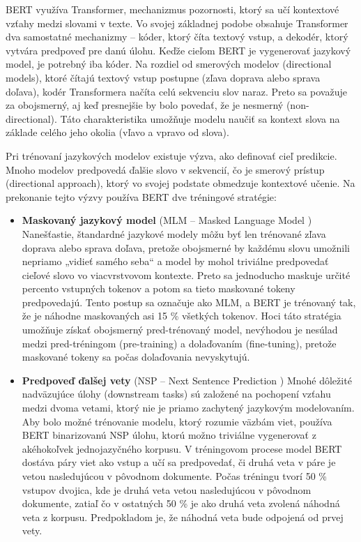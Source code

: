 BERT využíva Transformer, mechanizmus pozornosti, ktorý sa učí kontextové vzťahy medzi slovami  v texte. Vo svojej základnej podobe obsahuje Transformer dva samostatné mechanizmy – kóder, ktorý číta textový vstup, a dekodér, ktorý vytvára predpoveď pre danú úlohu. Keďže cieľom BERT je vygenerovať jazykový model, je potrebný iba kóder. Na rozdiel od smerových modelov (directional models), ktoré čítajú textový vstup postupne (zľava doprava alebo sprava doľava), kodér Transformera načíta celú sekvenciu slov naraz. Preto sa považuje za obojsmerný, aj keď presnejšie by bolo povedať, že je nesmerný (non-directional). Táto charakteristika umožňuje modelu naučiť sa kontext slova na základe celého jeho okolia (vľavo a vpravo od slova).

Pri trénovaní jazykových modelov existuje výzva, ako definovať cieľ predikcie. Mnoho modelov predpovedá ďalšie slovo v sekvencií, čo je smerový prístup (directional approach), ktorý vo svojej podstate obmedzuje kontextové učenie. Na prekonanie tejto výzvy používa BERT dve tréningové stratégie:
\begin{itemize}
    \item \textbf{Maskovaný jazykový model}  (MLM -- Masked Language Model )  Nanešťastie, štandardné  jazykové modely môžu byť len trénované zľava doprava alebo sprava doľava, pretože obojsmerné by každému slovu umožnili nepriamo „vidieť samého seba“ a model by mohol triviálne predpovedať cieľové slovo vo viacvrstvovom kontexte. Preto sa jednoducho maskuje určité percento vstupných tokenov a potom sa tieto maskované tokeny predpovedajú. Tento postup sa označuje ako MLM, a BERT je trénovaný tak, že je náhodne maskovaných asi 15 \% všetkých tokenov. Hoci táto stratégia umožňuje získať obojsmerný pred-trénovaný model, nevýhodou je nesúlad medzi pred-tréningom (pre-training) a dolaďovaním (fine-tuning), pretože maskované tokeny sa počas dolaďovania nevyskytujú.
    
    \item \textbf{Predpoveď ďalšej vety} (NSP -- Next Sentence Prediction ) Mnohé dôležité nadväzujúce úlohy (downstream tasks) sú založené na pochopení vzťahu medzi dvoma vetami, ktorý nie je priamo zachytený jazykovým modelovaním. Aby bolo možné trénovanie modelu, ktorý rozumie väzbám viet, používa BERT binarizovanú NSP úlohu, ktorú možno triviálne vygenerovať z akéhokoľvek jednojazyčného korpusu. V tréningovom procese model BERT dostáva páry viet ako vstup a učí sa predpovedať, či druhá veta v páre je vetou nasledujúcou v pôvodnom dokumente. Počas tréningu tvorí 50 \% vstupov dvojica, kde je druhá veta vetou nasledujúcou v pôvodnom dokumente, zatiaľ čo v ostatných 50 \% je ako druhá veta zvolená náhodná veta z korpusu. Predpokladom je, že náhodná veta bude odpojená od prvej vety.
\end{itemize}

